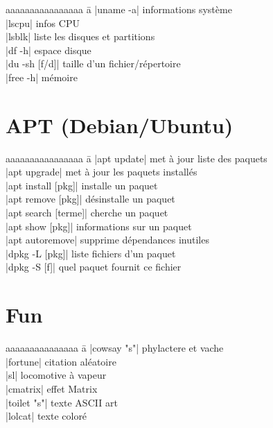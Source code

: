 \documentclass[9pt]{extarticle}
\begin{document}
\begin{multicols}{4}
    \begin{tabbing}
        aaaaaaaaaaaaaaaa \= a \kill
        \code|uname -a| \> informations système \\
        \code|lscpu| \> infos CPU \\
        \code|lsblk| \> liste les disques et partitions \\
        \code|df -h| \> espace disque \\
        \code|du -sh [f/d]| \> taille d'un fichier/répertoire \\
        \code|free -h| \> mémoire \\
    \end{tabbing}

    \section*{APT (Debian/Ubuntu)}
    \begin{tabbing}
        aaaaaaaaaaaaaaaa \= a \kill
        \code|apt update| \> met à jour liste des paquets \\
        \code|apt upgrade| \> met à jour les paquets installés \\
        \code|apt install [pkg]| \> installe un paquet \\
        \code|apt remove [pkg]| \> désinstalle un paquet \\
        \code|apt search [terme]| \> cherche un paquet \\
        \code|apt show [pkg]| \> informations sur un paquet \\
        \code|apt autoremove| \> supprime dépendances inutiles \\
        \code|dpkg -L [pkg]| \> liste fichiers d'un paquet \\
        \code|dpkg -S [f]| \> quel paquet fournit ce fichier \\
    \end{tabbing}

    \section*{Fun}

    \begin{tabbing}
        aaaaaaaaaaaaaaa \= a \kill
        \code|cowsay "s"| \> phylactere et vache \\
        \code|fortune| \> citation aléatoire  \\
        \code|sl| \> locomotive à vapeur  \\
        \code|cmatrix| \> effet Matrix  \\
        \code|toilet "s"| \> texte ASCII art  \\
        \code|lolcat| \> texte coloré  \\
    \end{tabbing}


\end{multicols}
\end{document}
